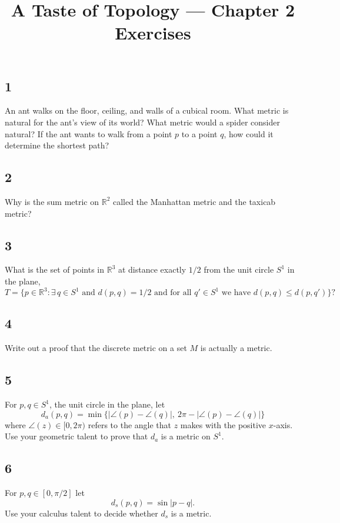 \documentclass{amsart}
\title{A Taste of Topology --- Chapter 2 Exercises}
\author{}
\date{}
\begin{document}
\maketitle

\subsection*{1}
An ant walks on the floor, ceiling, and walls of a cubical room. What metric is natural for the ant's view of its world? What metric would a spider consider natural? If the ant wants to walk from a point $p$ to a point $q$, how could it determine the shortest path?

\subsection*{2}
Why is the sum metric on $\mathbb{R}^2$ called the Manhattan metric and the taxicab metric?

\subsection*{3}
What is the set of points in $\mathbb{R}^3$ at distance exactly $1/2$ from the unit circle $S^1$ in the plane,
\[
T = \{p \in \mathbb{R}^3 : \exists\, q \in S^1 \text{ and } d(p,q) = 1/2 \text{ and for all } q' \in S^1 \text{ we have } d(p,q) \le d(p,q')\}?
\]

\subsection*{4}
Write out a proof that the discrete metric on a set $M$ is actually a metric.

\subsection*{5}
For $p, q \in S^1$, the unit circle in the plane, let
\[
d_a(p,q) = \min\{ |\angle(p) - \angle(q)|,\ 2\pi - |\angle(p) - \angle(q)| \}
\]
where $\angle(z) \in [0, 2\pi)$ refers to the angle that $z$ makes with the positive $x$-axis. Use your geometric talent to prove that $d_a$ is a metric on $S^1$.

\subsection*{6}
For $p, q \in [0, \pi/2]$ let
\[
d_s(p,q) = \sin|p-q|.
\]
Use your calculus talent to decide whether $d_s$ is a metric.
\end{document}
